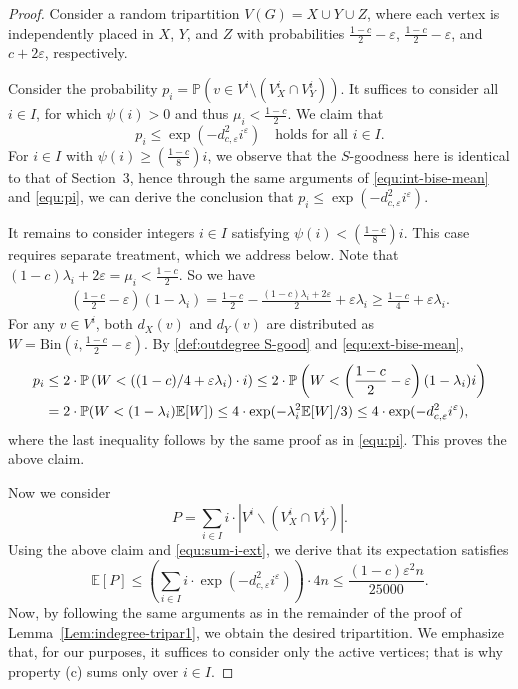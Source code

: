 \documentclass{aic}
\def\Bin{\mathrm{Bin}}
\newcommand{\E}{{\mathbb{E}}}
\newcommand{\Prob}{{\mathbb{P}}}
\begin{document}
	\begin{proof}
		Consider a random tripartition $V(G) = X \cup Y \cup Z$, where each vertex is independently placed in $X$, $Y$, and $Z$ with probabilities $\frac{1-c}{2} - \varepsilon$, $\frac{1-c}{2} - \varepsilon$, and $c + 2\varepsilon$, respectively.
		
		Consider the probability $p_i = \Prob\left(v \in V^i \setminus (V^i_X \cap V^i_Y)\right)$.
		It suffices to consider all $i\in I$, for which $\psi(i)>0$ and thus $\mu_i<\frac{1-c}{2}$.
		We claim that $$p_i\leq \exp(-d_{c,\varepsilon}^2i^{\varepsilon}) \mbox{ ~ holds for all~} i\in I.$$
		For $i\in I$ with $\psi(i)\geq \left(\frac{1-c}{8}\right)i$,
		we observe that the $S$-goodness here is identical to that of Section~3,
		hence through the same arguments of \eqref{equ:int-bise-mean} and \eqref{equ:pi},
		we can derive the conclusion that $p_i\leq \exp(-d_{c,\varepsilon}^2i^{\varepsilon})$.
		
		It remains to consider integers $i\in I$ satisfying $\psi(i) < \left(\frac{1-c}{8}\right)i$.
		This case requires separate treatment, which we address below.
		Note that $(1-c)\lambda_i+2\varepsilon=\mu_i< \frac{1-c}{2}$.
		So we have
		\begin{align}\label{equ:ext-bise-mean}
			\left(\frac{1-c}{2}-\varepsilon\right)(1-\lambda_i)=\frac{1-c}{2}-\frac{(1-c)\lambda_i+2\varepsilon}{2}+\varepsilon \lambda_i\geq \frac{1-c}4+\varepsilon \lambda_i.
		\end{align}
		For any $v\in V^i$,
		both $d_X(v)$ and $d_Y(v)$ are distributed as $W=\Bin(i,\frac{1-c}{2}-\varepsilon)$.
		By \eqref{def:outdegree S-good} and \eqref{equ:ext-bise-mean},
		\begin{align}\notag
			p_i&\le 2\cdot\Prob\left(W<((1-c)/4+\varepsilon\lambda_i)\cdot i\right)\le 2\cdot \Prob\left(W< \left(\frac{1-c}{2}-\varepsilon\right)(1-\lambda_i)i\right) \\\notag
			&=2\cdot\Prob(W<(1-\lambda_i)\E[W])\le 4\cdot \exp(-\lambda_i^2\E[W]/3)\le 4\cdot \exp(-d_{c,\varepsilon}^2i^{\varepsilon}),
		\end{align}
		where the last inequality follows by the same proof as in \eqref{equ:pi}.
		This proves the above claim.
		
		Now we consider $$P=\sum_{i\in I} i\cdot |V^i\backslash (V^i_X\cap V^i_Y)|.$$
		Using the above claim and \eqref{equ:sum-i-ext}, we derive that its expectation satisfies
		$$\E[P]\leq \left(\sum_{i\in I} i\cdot \exp(-d_{c,\varepsilon}^2i^{\varepsilon})\right)\cdot 4n\leq \frac{(1-c)\varepsilon^2n}{25000}.$$
		Now, by following the same arguments as in the remainder of the proof of Lemma~\ref{Lem:indegree-tripar1}, we obtain the desired tripartition.
		We emphasize that, for our purposes, it suffices to consider only the active vertices; that is why property (c) sums only over $i \in I$.
	\end{proof}
	
\end{document}

